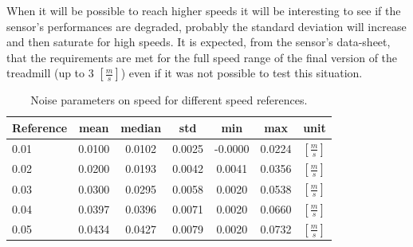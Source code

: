 \documentclass[12pt,a4paper, twoside]{article}
\begin{document}
When it will be possible to reach higher speeds it will be interesting to see if the sensor's performances are degraded, probably the standard deviation will increase and then saturate for high speeds. It is expected, from the sensor's data-sheet, that the requirements are met for the full speed range of the final version of the treadmill (up to 3 $[\frac{m}{s}]$) even if it was not possible to test this situation.

\begin{table}[H]
	\centering
	\begin{tabular}{l||c|c|c|c|c|r} 
	\textbf{Reference}&\textbf{mean} &\textbf{median} 
	&\textbf{std} & \textbf{min}&\textbf{max}& \textbf{unit}\\ 
	\hline
	\hline 
	0.01&0.0100&0.0102&0.0025&-0.0000&0.0224&$[\frac{m}{s}]$\\\hline
	0.02&0.0200&0.0193&0.0042&0.0041&0.0356&$[\frac{m}{s}]$\\\hline
	0.03&0.0300&0.0295&0.0058&0.0020&0.0538&$[\frac{m}{s}]$\\\hline
	0.04&0.0397&0.0396&0.0071&0.0020&0.0660&$[\frac{m}{s}]$\\\hline
	0.05&0.0434&0.0427&0.0079&0.0020&0.0732&$[\frac{m}{s}]$\\
	\end{tabular} 
	\caption{Noise parameters on speed for different speed references.}
	\label{tab:speed_param}
\end{table}
\end{document}
